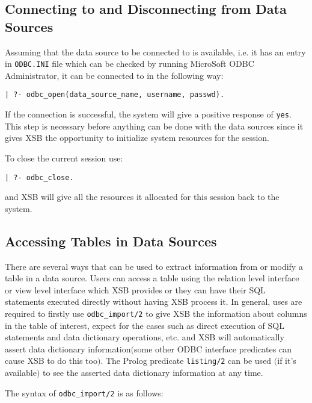 \subsection{Connecting to and Disconnecting from Data Sources}

Assuming that the data source to be connected to is available, i.e. it has an 
entry in {\tt ODBC.INI} file which can be checked by running MicroSoft 
ODBC Administrator, it can be connected to in the following way: 

\begin{center}
{\tt  | ?- odbc\_open(data\_source\_name, username, passwd).}
\end{center}

If the connection is successful, the system will give a positive response of 
{\tt yes}.  This step is necessary before anything can be done with the data 
sources since it gives XSB the opportunity to initialize system resources for 
the session.

To close the current session use:
\begin{center}
{\tt  | ?- odbc\_close.}
\end{center}

and XSB will give all the resources  it allocated for this session back to the
system.

\subsection{Accessing Tables in Data Sources}

There are several ways that can be used to extract information from or modify 
a table in a data source.  Users can access a table using the relation level interface 
or view level interface which XSB provides or they can have their SQL statements 
executed directly without having XSB process it.  In general,  uses are required 
to firstly use {\tt odbc\_import/2} to give XSB the information about columns 
in the table of interest, expect for the cases such as direct execution of SQL 
statements and data dictionary operations, etc. and XSB will automatically assert 
data dictionary information$($some other ODBC interface predicates can 
cause XSB to do this too$)$. The Prolog predicate {\tt listing/2} can be used
$($if it's available$)$ to see the asserted data dictionary information at any time.  

The syntax of  {\tt odbc\_import/2} is as follows:

